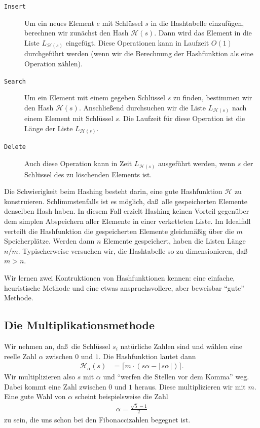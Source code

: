 \documentclass[10pt,reqno]{amsart}
\numberwithin{equation}{section}
\newcommand\cH{\mathcal H}
\begin{document}
\begin{description}
	\item[{\tt Insert}]
		Um ein neues Element $e$ mit Schl\"ussel $s$ in die Hashtabelle einzuf\"ugen, berechnen wir zun\"achst den Hash $\cH(s)$.
		Dann wird das Element in die Liste $L_{\cH(s)}$ eingef\"ugt.
		Diese Operationen kann in Laufzeit $O(1)$ durchgef\"uhrt werden (wenn wir die Berechnung der Hashfunktion als eine Operation z\"ahlen).
	\item[\tt Search]
		Um ein Element mit einem gegeben Schl\"ussel $s$ zu finden, bestimmen wir den Hash $\cH(s)$. 
		Anschlie\ss end durchsuchen wir die Liste $L_{\cH(s)}$ nach einem Element mit Schl\"ussel $s$.
		Die Laufzeit f\"ur diese Operation ist die L\"ange der Liste $L_{\cH(s)}$.
	\item[\tt Delete] Auch diese Operation kann in Zeit $L_{\cH(s)}$ ausgef\"uhrt werden, wenn $s$ der Schl\"ussel des zu l\"oschenden Elements ist.
\end{description}

Die Schwierigkeit beim Hashing besteht darin, eine gute Hashfunktion $\cH$ zu konstruieren.
Schlimmstenfalls ist es m\"oglich, da\ss\ alle gespeicherten Elemente denselben Hash haben.
In diesem Fall erzielt Hashing keinen Vorteil gegen\"uber dem simplen Abspeichern aller Elemente in einer verketteten Liste.
Im Idealfall verteilt die Hashfunktion die gespeicherten Elemente gleichm\"a\ss ig \"uber die $m$ Speicherpl\"atze.
Werden dann $n$ Elemente gespeichert, haben die Listen L\"ange $n/m$.
Typischerweise versuchen wir, die Hashtabelle so zu dimensionieren, da\ss\ $m>n$.

Wir lernen zwei Kontruktionen von Hashfunktionen kennen: eine einfache, heuristische Methode und eine etwas anspruchsvollere, aber beweisbar ``gute'' Methode.

\subsection{Die Multiplikationsmethode}\label{sec_hash_mult}
Wir nehmen an, da\ss\ die Schl\"ussel $s_i$ nat\"urliche Zahlen sind und w\"ahlen eine reelle Zahl $\alpha$ zwischen $0$ und $1$.
Die Hashfunktion lautet dann
	\begin{align*}
		\cH_\alpha(s)&=\lceil m \cdot (s\alpha-\lfloor s\alpha\rfloor)\rceil.
	\end{align*}
Wir multiplizieren also $s$ mit $\alpha$ und ``werfen die Stellen vor dem Komma'' weg.
Dabei kommt eine Zahl zwischen $0$ und $1$ heraus.
Diese multiplizieren wir mit $m$.
Eine gute Wahl von $\alpha$ scheint beispielsweise die Zahl
\begin{align*}
	\alpha=\frac{\sqrt 5-1}2
\end{align*}
zu sein, die uns schon bei den Fibonaccizahlen begegnet ist.
\end{document}
